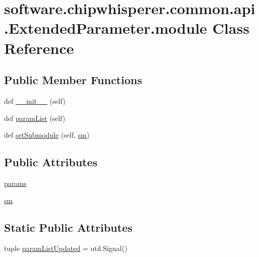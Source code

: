 \hypertarget{classsoftware_1_1chipwhisperer_1_1common_1_1api_1_1ExtendedParameter_1_1module}{}\section{software.\+chipwhisperer.\+common.\+api.\+Extended\+Parameter.\+module Class Reference}
\label{classsoftware_1_1chipwhisperer_1_1common_1_1api_1_1ExtendedParameter_1_1module}
\subsection*{Public Member Functions}
\begin{DoxyCompactItemize}
\item 
def \hyperlink{classsoftware_1_1chipwhisperer_1_1common_1_1api_1_1ExtendedParameter_1_1module_aeb978fc4f8131d6870af7c56bd6c56e4}{\+\_\+\+\_\+init\+\_\+\+\_\+} (self)
\item 
def \hyperlink{classsoftware_1_1chipwhisperer_1_1common_1_1api_1_1ExtendedParameter_1_1module_ad7ecbcf311435aa8f5cd588fe8ab278c}{param\+List} (self)
\item 
def \hyperlink{classsoftware_1_1chipwhisperer_1_1common_1_1api_1_1ExtendedParameter_1_1module_aab8e2f0cfb547c4133072e7e61faeb8c}{set\+Submodule} (self, \hyperlink{classsoftware_1_1chipwhisperer_1_1common_1_1api_1_1ExtendedParameter_1_1module_ae8580335d1d31a863cb6992c26518746}{sm})
\end{DoxyCompactItemize}
\subsection*{Public Attributes}
\begin{DoxyCompactItemize}
\item 
\hyperlink{classsoftware_1_1chipwhisperer_1_1common_1_1api_1_1ExtendedParameter_1_1module_a196c0852bd3e2daef38f573b77622a2f}{params}
\item 
\hyperlink{classsoftware_1_1chipwhisperer_1_1common_1_1api_1_1ExtendedParameter_1_1module_ae8580335d1d31a863cb6992c26518746}{sm}
\end{DoxyCompactItemize}
\subsection*{Static Public Attributes}
\begin{DoxyCompactItemize}
\item 
tuple \hyperlink{classsoftware_1_1chipwhisperer_1_1common_1_1api_1_1ExtendedParameter_1_1module_aacb7c15cb49374166b0f79d25d9e3859}{param\+List\+Updated} = util.\+Signal()
\end{DoxyCompactItemize}


